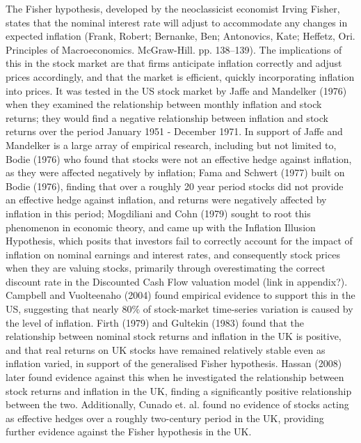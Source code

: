 \documentclass[12pt,a4paper]{article}
\begin{document}
The Fisher hypothesis, developed by the neoclassicist economist Irving Fisher, states that the nominal interest rate will adjust to accommodate any changes in expected inflation (Frank, Robert; Bernanke, Ben; Antonovics, Kate; Heffetz, Ori. Principles of Macroeconomics. McGraw-Hill. pp. 138–139). The implications of this in the stock market are that firms anticipate inflation correctly and adjust prices accordingly, and that the market is efficient, quickly incorporating inflation into prices. It was tested in the US stock market by Jaffe and Mandelker (1976) when they examined the relationship between monthly inflation and stock returns; they would find a negative relationship between inflation and stock returns over the period January 1951 - December 1971. In support of Jaffe and Mandelker is a large array of empirical research, including but not limited to, Bodie (1976) who found that stocks were not an effective hedge against inflation, as they were affected negatively by inflation; Fama and Schwert (1977) built on Bodie (1976), finding that over a roughly 20 year period stocks did not provide an effective hedge against inflation, and returns were negatively affected by inflation in this period; Mogdiliani and Cohn (1979) sought to root this phenomenon in economic theory, and came up with the Inflation Illusion Hypothesis, which posits that investors fail to correctly account for the impact of inflation on nominal earnings and interest rates, and consequently stock prices when they are valuing stocks, primarily through overestimating the correct discount rate in the Discounted Cash Flow valuation model (link in appendix?). Campbell and Vuolteenaho (2004) found empirical evidence to support this in the US, suggesting that nearly $80\%$ of stock-market time-series variation is caused by the level of inflation. Firth (1979) and Gultekin (1983) found that the relationship between nominal stock returns and inflation in the UK is positive, and that real returns on UK stocks have remained relatively stable even as inflation varied, in support of the generalised Fisher hypothesis. Hassan (2008) later found evidence against this when he investigated the relationship between stock returns and inflation in the UK, finding a significantly positive relationship between the two. Additionally, Cunado et. al. found no evidence of stocks acting as effective hedges over a roughly two-century period in the UK, providing further evidence against the Fisher hypothesis in the UK.
\end{document}
